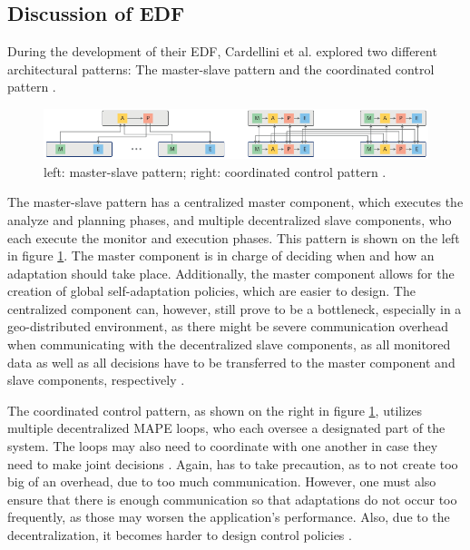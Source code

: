         \subsection{Discussion of EDF}
        \label{sub:discussion-edf}
        During the development of their EDF, Cardellini et al. explored two different architectural patterns: The master-slave pattern and the coordinated control pattern \cite[p. 174]{cardellini}.

        \begin{figure}[hbt]
            \centering
            \includegraphics[width=1.0\textwidth]{Bilder/master_coordinated.png}
            \caption{
                    left: master-slave pattern; right: coordinated control pattern \cite[p. 175]{cardellini}.
            }
            \label{fig:master_coordinated}
        \end{figure}

        \quad The master-slave pattern has a centralized master component, which executes the analyze and planning phases, and multiple decentralized slave components, 
        who each execute the monitor and execution phases. This pattern is shown on the left in figure \ref{fig:master_coordinated}.
        The master component is in charge of deciding when and how an adaptation should take place.
        Additionally, the master component allows for the creation of global self-adaptation policies, which are easier to design.
        The centralized component can, however, still prove to be a bottleneck, especially in a geo-distributed environment, as there might be severe communication overhead when communicating 
        with the decentralized slave components, as all monitored data as well as all decisions have to be transferred to the master component and slave components, respectively  \cite[p. 174]{cardellini}. 

        \quad The coordinated control pattern, as shown on the right in figure \ref{fig:master_coordinated}, utilizes multiple decentralized MAPE loops, who each oversee a designated part of the system. 
        The loops may also need to coordinate with one another in case they need to make joint decisions \cite[p. 175]{cardellini}. Again, has to take precaution, as to not create too big of an overhead, due to too much communication.
        However, one must also ensure that there is enough communication so that adaptations do not occur too frequently, as those may worsen the application's performance.
        Also, due to the decentralization, it becomes harder to design control policies \cite[p. 175]{cardellini}.
        
